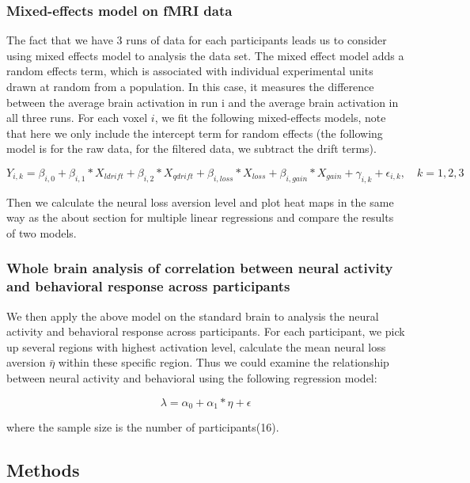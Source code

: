 \documentclass[11pt]{article}
\begin{document}
\subsubsection{Mixed-effects model on fMRI data}

The fact that we have 3 runs of data for each participants leads us to consider 
using mixed effects model to analysis the data set. The mixed effect model adds 
a random effects term, which is associated with individual experimental units 
drawn at random from a population. In this case, it measures the difference 
between the average brain activation in run i and the 
average brain activation in all three runs. For each voxel $i$, we fit the 
following mixed-effects models, note that here we only include the intercept 
term for random effects (the following model is for the raw data, for the 
filtered data, we subtract the drift terms).

\begin{equation}
Y_{i, k} = \beta_{i, 0} + \beta_{i,1} *X_{ldrift} + \beta_{i, 2} * X_{qdrift} 
+  \beta_{i, loss} *X_{loss} + \beta_{i, gain} * X_{gain}  + \gamma _{i, k} 
+ \epsilon_{i, k}, \quad k =1, 2, 3
\end{equation}

Then we calculate the neural loss aversion level and plot heat maps in the same 
way as the about section for multiple linear regressions and compare the 
results of two models. 

\subsubsection{Whole brain analysis of correlation between 
neural activity and behavioral response across participants}

We then apply the above model on the standard brain to analysis the neural 
activity and behavioral response across participants. For each participant, 
we pick up several regions with highest activation level, calculate the mean 
neural loss aversion $\bar{\eta}$ within these specific region. Thus we could 
examine the relationship between neural activity and behavioral using the 
following regression model:

\begin{equation}
\lambda = \alpha_0 + \alpha_1 * \eta + \epsilon
\end{equation}

where the sample size is the number of participants(16).

\subsection{Methods}
\end{document}
